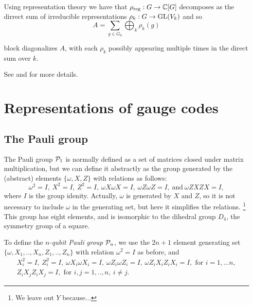 \documentclass[12pt]{article}
\begin{document}
Using representation theory we have that 
$\rho_\mathrm{reg}:G\to \mathbb{C}[G]$
decomposes as the dirrect sum of irreducible
representations $\rho_k:G\to \mathrm{GL}(V_k)$
and so
$$
    A = \sum_{g\in G_0}\bigoplus_k \rho_k(g)
$$

block diagonalizes $A$,
with each $\rho_k$ possibly appearing multiple
times in the direct sum over $k$.


See \cite{Diaconis1981} and \cite{Kaski2002} for more details.

%
%

\section{Representations of gauge codes}

\subsection{The Pauli group}

The Pauli group $\mathcal{P}_1$ is normally 
defined as a set of matrices closed under
matrix multiplication, but we can define
it abstractly
as the group generated
by the (abstract) elements $\{\omega, X, Z\}$ with
relations as follows:
$$
\omega^2=I,\ X^2=I,\ Z^2=I,\ \omega X\omega X=I,\ \omega Z\omega Z=I,\ \mbox{and}\  \omega ZXZX=I,
$$
where $I$ is the group idenity.
Actually, $\omega $ is generated by $X$ and $Z$, so
it is not necessary to include $\omega $ in the generating set,
but here it simplifies the relations.
\footnote{We leave out $Y$ because...}
This group has eight elements, and is isomorphic to the dihedral group $D_4$,
the symmetry group of a square.

To define
the {\it $n$-qubit Pauli group} $\mathcal{P}_n$, 
we use the $2n+1$ element 
generating set $\{\omega , X_1, .., X_n, Z_1, .., Z_n\}$
with relation $\omega^2=I$ as before, and
\begin{equation}\label{presentation}
\begin{array}{c}
X_i^2=I,\ Z_i^2=I,\ \omega X_i\omega X_i=I,\ \omega Z_i\omega Z_i=I,\ \omega Z_iX_iZ_iX_i=I, 
\mbox{\ for\ } i=1,...n,\\
Z_iX_jZ_iX_j=I, \mbox{\ for\ } i, j = 1,..,n,\ i\ne j.
\end{array}
\end{equation}
\end{document}
